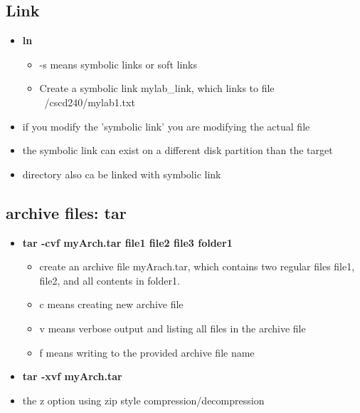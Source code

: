\documentclass{article}
\begin{document}
\subsection*{Link}
\begin{itemize}
  \item \textbf{ln}
  \begin{itemize}
    \item -s means symbolic links or soft links
    \item Create a symbolic link mylab\_link, which links to file ~/cscd240/mylab1.txt
  \end{itemize}
  \item if you modify the 'symbolic link' you are modifying the actual file
  \item the symbolic link can exist on a different disk partition than the target
  \item directory also ca be linked with symbolic link
\end{itemize}
\subsection*{archive files: tar}
\begin{itemize}
  \item \textbf{tar -cvf myArch.tar file1 file2 file3 folder1}
  \begin{itemize}
    \item create an archive file myArach.tar, which contains two regular files file1, file2, and all contents in folder1.
    \item c means creating new archive file
    \item v means verbose output and listing all files in the archive file
    \item f means writing to the provided archive file name
  \end{itemize}
  \item \textbf{tar -xvf myArch.tar}
  \item the z option using zip style compression/decompression
\end{itemize}
\end{document}
